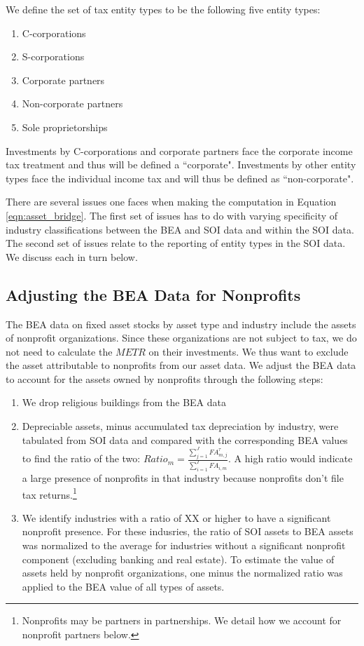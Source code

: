 \documentclass[article,11pt,letterpaper,fleqn]{article}
\theoremstyle{definition}
\numberwithin{equation}{section}
\begin{document}
We define the set of tax entity types to be the following five entity types:
\begin{enumerate}
\item C-corporations
\item S-corporations
\item Corporate partners
\item Non-corporate partners
\item Sole proprietorships
\end{enumerate}

Investments by C-corporations and corporate partners face the corporate income tax treatment and thus will be defined a ``corporate".  Investments by other entity types face the individual income tax and will thus be defined as ``non-corporate".

There are several issues one faces when making the computation in Equation \ref{eqn:asset_bridge}.  The first set of issues has to do with varying specificity of industry classifications between the BEA and SOI data and within the SOI data.  The second set of issues relate to the reporting of entity types in the SOI data.  We discuss each in turn below.

\subsection{Adjusting the BEA Data for Nonprofits}
The BEA data on fixed asset stocks by asset type and industry include the assets of nonprofit organizations. Since these organizations are not subject to tax, we do not need to calculate the $METR$ on their investments.  We thus want to exclude the asset attributable to nonprofits from our asset data.  We adjust the BEA data to account for the assets owned by nonprofits through the following steps:

\begin{enumerate}
\item We drop religious buildings from the BEA data
\item Depreciable assets, minus accumulated tax depreciation by industry, were tabulated from SOI data and compared with the corresponding BEA values to find the ratio of the two: $Ratio_{m}=\frac{\sum_{j=1}^{J}FA^{\tau}_{m,j}}{\sum_{i=1}^{I}FA_{i,m}}$.  A high ratio would indicate a large presence of nonprofits in that industry because nonprofits don't file tax returns.\footnote{Nonprofits may be partners in partnerships.  We detail how we account for nonprofit partners below.}
\item We identify industries with a ratio of XX or higher to have a significant nonprofit presence.  For these indusries, the ratio of SOI assets to BEA assets was normalized to the average for industries without a significant nonprofit component (excluding banking and real estate). To estimate the value of assets held by nonprofit organizations, one minus the normalized ratio was applied to the BEA value of all types of assets.
\end{enumerate}
\end{document}

